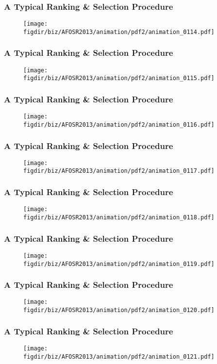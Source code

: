 \documentclass[13pt]{beamer}
\newcommand{\figdir}{../../fig}
\begin{document}
\begin{frame}\frametitle{A Typical Ranking \& Selection Procedure}\begin{figure}\texttt{[image: \\figdir/biz/AFOSR2013/animation/pdf2/animation\_0114.pdf]}\end{figure}\end{frame}
\begin{frame}\frametitle{A Typical Ranking \& Selection Procedure}\begin{figure}\texttt{[image: \\figdir/biz/AFOSR2013/animation/pdf2/animation\_0115.pdf]}\end{figure}\end{frame}
\begin{frame}\frametitle{A Typical Ranking \& Selection Procedure}\begin{figure}\texttt{[image: \\figdir/biz/AFOSR2013/animation/pdf2/animation\_0116.pdf]}\end{figure}\end{frame}
\begin{frame}\frametitle{A Typical Ranking \& Selection Procedure}\begin{figure}\texttt{[image: \\figdir/biz/AFOSR2013/animation/pdf2/animation\_0117.pdf]}\end{figure}\end{frame}
\begin{frame}\frametitle{A Typical Ranking \& Selection Procedure}\begin{figure}\texttt{[image: \\figdir/biz/AFOSR2013/animation/pdf2/animation\_0118.pdf]}\end{figure}\end{frame}
\begin{frame}\frametitle{A Typical Ranking \& Selection Procedure}\begin{figure}\texttt{[image: \\figdir/biz/AFOSR2013/animation/pdf2/animation\_0119.pdf]}\end{figure}\end{frame}
\begin{frame}\frametitle{A Typical Ranking \& Selection Procedure}\begin{figure}\texttt{[image: \\figdir/biz/AFOSR2013/animation/pdf2/animation\_0120.pdf]}\end{figure}\end{frame}
\begin{frame}\frametitle{A Typical Ranking \& Selection Procedure}\begin{figure}\texttt{[image: \\figdir/biz/AFOSR2013/animation/pdf2/animation\_0121.pdf]}\end{figure}\end{frame}
\end{document}
